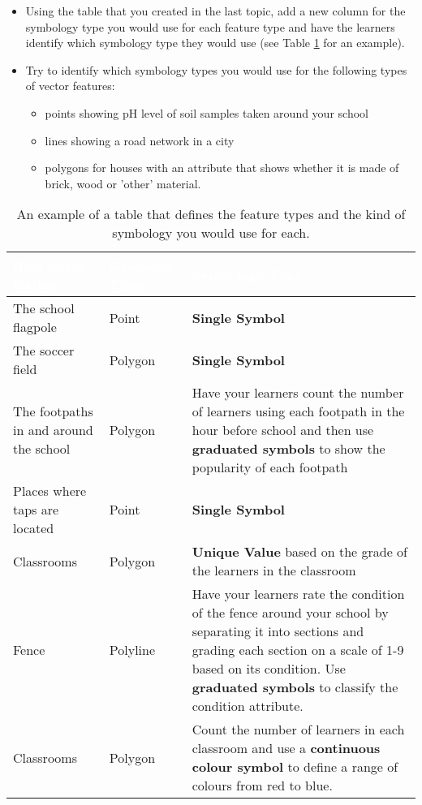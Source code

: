 \begin{itemize}
\item Using the table that you created in the last topic, add a new column for the
symbology type you would use for each feature type and have the learners
identify which symbology type they would use (see Table \ref{tab:featuretype}
for an example).
\item Try to identify which symbology types you would use for the following types
of vector features:
\begin{itemize}
\item points showing pH level of soil samples taken around your school
\item lines showing a road network in a city
\item polygons for houses with an attribute that shows whether it is made of brick,
wood or 'other' material.
\end{itemize}
\end{itemize}

\begin{table}[ht]
\centering
\caption{An example of a table that defines the feature types and the kind of
symbology you would use for each.}\medskip
 \label{tab:featuretype}
 \begin{tabular}{|p{4cm}|p{3cm}|p{9cm}|}
 \hline
 \rowcolor{black}
 \textcolor{white}{\textbf{Real world feature}} &
 \textcolor{white}{\textbf{Geometry Type}} & 
 \textcolor{white}{\textbf{Symbology Type}} \\
 \hline The school flagpole & Point & \textbf{Single Symbol} \\
 \hline The soccer field & Polygon & \textbf{Single Symbol} \\
 \hline The footpaths in and around the school & Polygon & Have your learners
count the number of learners using each footpath in the hour before school
and then use \textbf{graduated symbols} to show the popularity of each footpath \\
 \hline Places where taps are located & Point & \textbf{Single Symbol} \\
 \hline Classrooms & Polygon & \textbf{Unique Value} based on the grade of
the learners in the classroom \\
 \hline Fence & Polyline & Have your learners rate the condition of the fence
around your school by separating it into sections and grading each  section
on a scale of 1-9 based on its condition. Use \textbf{graduated symbols} to
classify the condition attribute. \\
 \hline Classrooms & Polygon & Count the number of learners in each classroom
and use a \textbf{continuous colour symbol} to define a range of colours from
red to blue. \\
\hline
\end{tabular}
\end{table}

